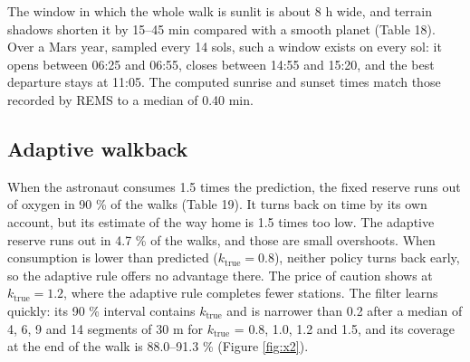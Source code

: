 \documentclass[11pt,a4paper]{article}
\begin{document}
The window in which the whole walk is sunlit is about 8 h wide, and terrain shadows shorten it by 15--45 min compared with a smooth planet (Table 18). Over a Mars year, sampled every 14 sols, such a window exists on every sol: it opens between 06:25 and 06:55, closes between 14:55 and 15:20, and the best departure stays at 11:05. The computed sunrise and sunset times match those recorded by REMS to a median of 0.40 min.

\subsection{Adaptive walkback}

\begin{table}[H]
\centering\small
\caption{\textbf{Table 19. Simulated walks with a known consumption factor} (round trip to the ridge station, budget 1.25 times the plan, 300 walks per case).}
\end{table}

When the astronaut consumes 1.5 times the prediction, the fixed reserve runs out of oxygen in 90 \% of the walks (Table 19). It turns back on time by its own account, but its estimate of the way home is 1.5 times too low. The adaptive reserve runs out in 4.7 \% of the walks, and those are small overshoots. When consumption is lower than predicted ($k_\text{true} = 0.8$), neither policy turns back early, so the adaptive rule offers no advantage there. The price of caution shows at $k_\text{true} = 1.2$, where the adaptive rule completes fewer stations. The filter learns quickly: its 90 \% interval contains $k_\text{true}$ and is narrower than 0.2 after a median of 4, 6, 9 and 14 segments of 30 m for $k_\text{true}$ = 0.8, 1.0, 1.2 and 1.5, and its coverage at the end of the walk is 88.0--91.3 \% (Figure \ref{fig:x2}).
\end{document}
